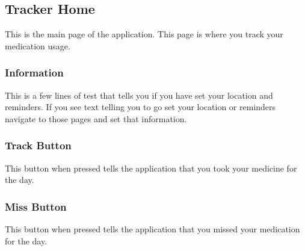 \documentclass{article}
\begin{document}
\subsection{Tracker Home}
This is the main page of the application. This page is where you track your medication usage.
\subsubsection{Information}
This is a few lines of test that tells you if you have set your location and reminders. If you see text telling you to go set your location or reminders navigate to those pages and set that information.
\subsubsection{Track Button}
This button when pressed tells the application that you took your medicine for the day.
\subsubsection{Miss Button}
This button when pressed tells the application that you missed your medication for the day.
\end{document}
